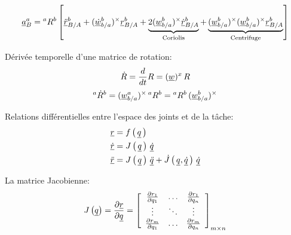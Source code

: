 \begin{align}
\underline{a}_{B}^{a} 
= 
{}^{a}R^b \left[ 
\underline{\ddot{r}}^b_{B/A}
+ 
(\underline{\dot{w}}_{b/a}^b)^{\times} \underline{r}^b_{B/A}  
+
\underbrace{
2 (\underline{w}_{b/a}^b)^{\times} \underline{\dot{r}}^b_{B/A}  
}_{\text{Coriolis}}
+
\underbrace{
(\underline{w}_{b/a}^b)^{\times} (\underline{w}_{b/a}^b)^{\times} \underline{r}^b_{B/A}  
}_{\text{Centrifuge}}
\right] 
\end{align}

Dérivée temporelle d'une matrice de rotation:
\begin{equation}
\dot{R} = \frac{d}{dt} R = (\underline{w})^x \, R
\end{equation}
\begin{equation}
{}^{a}\dot{R}^b =  (\underline{w}_{b/a}^a)^{\times} \, {}^{a}R^b =   {}^{a}R^b \, (\underline{w}_{b/a}^b)^{\times}
\end{equation}

Relations différentielles entre l'espace des joints et de la tâche:
\begin{align}
\underline{r} &= f\left( \, \underline{q} \, \right) \\
\underline{\dot{r}} &= J\left( \, \underline{q} \, \right) \, \underline{\dot{q}} \\
\underline{\ddot{r}} &= J\left( \, \underline{q} \, \right) \, \underline{\ddot{q}}  + \dot{J} \left( \, \underline{q}  , \underline{\dot{q}} \, \right) \, \underline{\dot{q}} 
\end{align}

La matrice Jacobienne:
\begin{equation}
J\left( \underline{q} \right) = \frac{\partial \underline{r}}{\partial \underline{q}} = 
\left[ \begin{array}{c c c} 
\frac{\partial r_1 }{\partial q_1}   &  \hdots & \frac{\partial r_1 }{\partial q_n} \\ 
\vdots                               &  \ddots & \vdots                             \\
\frac{\partial r_m }{\partial q_1}   &  \hdots & \frac{\partial r_m }{\partial q_n}
\end{array} \right]_{m \times n}
\end{equation}
